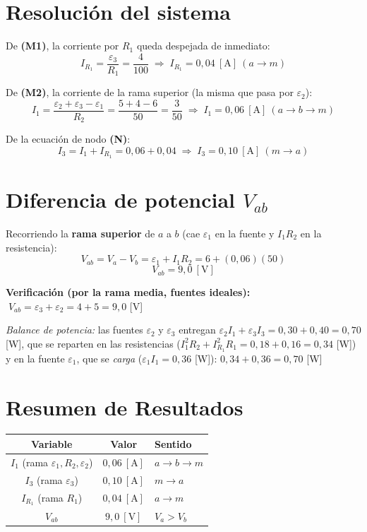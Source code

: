 \documentclass[12pt,letterpaper]{article}
\begin{document}
\section*{Resoluci\'on del sistema}

\noindent De \textbf{(M1)}, la corriente por $R_1$ queda despejada de inmediato:
\[
    I_{R_1} = \frac{\varepsilon_3}{R_1} = \frac{4}{100}
    \;\Rightarrow\; \boxed{I_{R_1} = 0{,}04\ [\text{A}]\ (a\to m)}
\]

\noindent De \textbf{(M2)}, la corriente de la rama superior (la misma que pasa por $\varepsilon_2$):
\[
    I_1 = \frac{\varepsilon_2+\varepsilon_3-\varepsilon_1}{R_2}
        = \frac{5+4-6}{50} = \frac{3}{50}
    \;\Rightarrow\; \boxed{I_1 = 0{,}06\ [\text{A}]\ (a\to b\to m)}
\]

\noindent De la ecuaci\'on de nodo \textbf{(N)}:
\[
    I_3 = I_1 + I_{R_1} = 0{,}06 + 0{,}04
    \;\Rightarrow\; \boxed{I_3 = 0{,}10\ [\text{A}]\ (m\to a)}
\]

\section*{Diferencia de potencial $V_{ab}$}

Recorriendo la \textbf{rama superior} de $a$ a $b$ (cae $\varepsilon_1$ en la fuente y $I_1R_2$ en
la resistencia):
\[
    V_{ab} = V_a - V_b = \varepsilon_1 + I_1 R_2 = 6 + (0{,}06)(50)
\]
\[
    \boxed{V_{ab} = 9{,}0\ [\text{V}]}
\]

\noindent\textbf{Verificaci\'on (por la rama media, fuentes ideales):}
$\;V_{ab} = \varepsilon_3 + \varepsilon_2 = 4 + 5 = 9{,}0$ [V] \checkmark

\medskip
\noindent\small\textit{Balance de potencia:} las fuentes $\varepsilon_2$ y $\varepsilon_3$ entregan
$\varepsilon_2 I_1 + \varepsilon_3 I_3 = 0{,}30 + 0{,}40 = 0{,}70$ [W], que se reparten en las
resistencias ($I_1^2R_2 + I_{R_1}^2R_1 = 0{,}18+0{,}16 = 0{,}34$ [W]) y en la fuente
$\varepsilon_1$, que se \emph{carga} ($\varepsilon_1 I_1 = 0{,}36$ [W]): $0{,}34+0{,}36 = 0{,}70$
[W] \checkmark\normalsize

\section*{Resumen de Resultados}

\begin{center}
\renewcommand{\arraystretch}{1.2}
\begin{tabular}{|c|c|l|}
\hline
\textbf{Variable} & \textbf{Valor} & \textbf{Sentido} \\
\hline
$I_1$ (rama $\varepsilon_1,R_2,\varepsilon_2$) & $0{,}06\ [\text{A}]$ & $a\to b\to m$ \\
$I_3$ (rama $\varepsilon_3$)                   & $0{,}10\ [\text{A}]$ & $m\to a$ \\
$I_{R_1}$ (rama $R_1$)                         & $0{,}04\ [\text{A}]$ & $a\to m$ \\
\hline
$V_{ab}$ & $9{,}0\ [\text{V}]$ & $V_a>V_b$ \\
\hline
\end{tabular}
\end{center}
\end{document}
